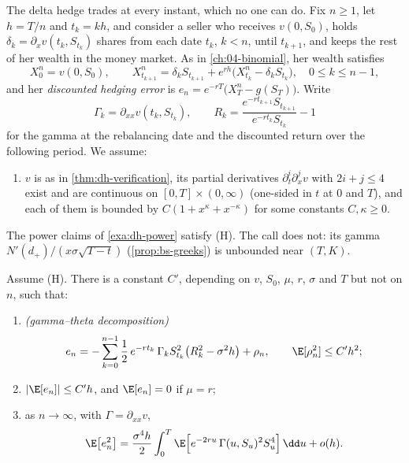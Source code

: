 The delta hedge trades at every instant, which no one can do. Fix $n\ge1$, let $h=T/n$ and
$t_k=kh$, and consider a seller who receives $v(0,S_0)$, holds $\delta_k=\partial_xv(t_k,S_{t_k})$
shares from each date $t_k$, $k<n$, until $t_{k+1}$, and keeps the rest of her wealth in
the money market. As in \cref{ch:04-binomial}, her wealth satisfies
\[
  X^n_0=v(0,S_0),\qquad
  X^n_{t_{k+1}}=\delta_kS_{t_{k+1}}+e^{rh}\big(X^n_{t_k}-\delta_kS_{t_k}\big),\quad0\le k\le n-1,
\]
and her \emph{discounted hedging error} is $e_n=e^{-rT}\big(X^n_T-g(S_T)\big)$. Write
\[
  \Gamma_k=\partial_{xx}v(t_k,S_{t_k}),\qquad
  R_k=\frac{e^{-rt_{k+1}}S_{t_{k+1}}}{e^{-rt_k}S_{t_k}}-1
\]
for the gamma at the rebalancing date and the discounted return over the following period. We
assume:
\begin{enumerate}[label=(H),leftmargin=*]
  \item $v$ is as in \cref{thm:dh-verification}, its partial derivatives
    $\partial_t^i\partial_x^jv$ with $2i+j\le4$ exist and are continuous on
    $[0,T]\times(0,\infty)$ (one-sided in $t$ at $0$ and $T$), and each of them is bounded by
    $C(1+x^\kappa+x^{-\kappa})$ for some constants $C,\kappa\ge0$.
\end{enumerate}
The power claims of \cref{exa:dh-power} satisfy (H). The call does not: its gamma
$N'(d_+)/(x\sigma\sqrt{T-t})$ (\cref{prop:bs-greeks}) is unbounded near $(T,K)$.

\begin{proposition}\label{prop:dh-hedging-error}
Assume (H). There is a constant $C'$, depending on $v$, $S_0$, $\mu$, $r$, $\sigma$ and $T$ but
not on $n$, such that:
\begin{enumerate}[label=(\roman*)]
  \item \emph{(gamma--theta decomposition)}
    \begin{equation}\label{eq:dh-gamma-theta}
      e_n=-\sum_{k=0}^{n-1}\frac12\,e^{-rt_k}\,\Gamma_kS_{t_k}^2\big(R_k^2-\sigma^2h\big)+\rho_n,
      \qquad\E[\rho_n^2]\le C'h^2;
    \end{equation}
  \item $|\E[e_n]|\le C'h$, and $\E[e_n]=0$ if $\mu=r$;
  \item as $n\to\infty$, with $\Gamma=\partial_{xx}v$,
    \begin{equation}\label{eq:dh-error-variance}
      \E\big[e_n^2\big]=\frac{\sigma^4h}{2}\int_0^T\E\Big[e^{-2ru}\,\Gamma(u,S_u)^2S_u^4\Big]\,\dd u+o(h).
    \end{equation}
\end{enumerate}
\end{proposition}

